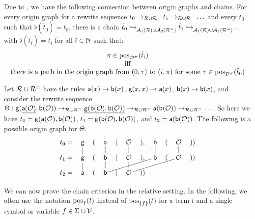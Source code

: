 Due to , we have the following connection between origin graphs and
chains. For every origin graph for a
rewrite sequence $t_0 \to_{\mathcal{R} \cup \mathcal{R}^{=}} t_1 \to_{\mathcal{R} \cup \mathcal{R}^{=}} \ldots$ and every
$\tilde{t}_0$ such that $\flat(\tilde{t}_0) = t_0$, there is a chain
 $\tilde{t}_0 \mathrel{ \xhookrightarrow{{}_{\scriptstyle }} \!\!{}^{}_{\mathcal{A}_{1}(\mathcal{R}) \cup \mathcal{A}_{2}(\mathcal{R}^{=})} } \tilde{t}_{1}
\mathrel{ \xhookrightarrow{{}_{\scriptstyle }} \!\!{}^{}_{\mathcal{A}_{1}(\mathcal{R}) \cup \mathcal{A}_{2}(\mathcal{R}^{=})} } \ldots$ with
$\flat(\tilde{t}_i) = t_i$ for all $i \in \mathbb{N}$ such that:
\[ \begin{array}{c}
\text{$\pi \in 
\mathrm{pos}_{\mathcal{D}^\#}(\tilde{t}_i)$}\\
\text{iff}\\
\text{there is a path in the origin graph
from $(0,\tau)$ to $(i,\pi)$ for some $\tau
\in \mathrm{pos}_{\mathcal{D}^\#}(\tilde{t}_0)$}
  \end{array}\]

\begin{example}\label{graph1}
    Let $\mathcal{R} \cup \mathcal{R}^{=}$ have 
    the rules $\mathsf{a}(x) \to \mathsf{b}(x)$, $\mathsf{g}(x,x) \to \mathsf{a}(x)$,   $\mathsf{b}(x) \to \mathsf{b}(x)$, and
    consider
    the rewrite sequence
    $\Theta:\mathsf{g}(\underline{\mathsf{a}(\mathcal{O})}, \mathsf{b}(\mathcal{O})) \to_{\mathcal{R}\cup \mathcal{R}^{=}} \underline{\mathsf{g}(\mathsf{b}(\mathcal{O}), \mathsf{b}(\mathcal{O}))} \to_{\mathcal{R}\cup \mathcal{R}^{=}} \mathsf{a}(\mathsf{b}(\mathcal{O})) \to_{\mathcal{R}\cup \mathcal{R}^{=}} \ldots$. So here we
    have $t_0 = \mathsf{g}(\mathsf{a}(\mathcal{O}), \mathsf{b}(\mathcal{O}))$, $t_1 = \mathsf{g}(\mathsf{b}(\mathcal{O}), \mathsf{b}(\mathcal{O}))$, and $t_2 =
    \mathsf{a}(\mathsf{b}(\mathcal{O}))$.
    The following is a possible origin graph for $\Theta$.
    \[ \xymatrix @-1.5pc {
        t_0=&\tg \ar@{-}[d] &(& \ta \ar@{-}[d]&(&\O\ar@{-}[d]&), & \tb\ar@{-}[d] & (&\O\ar@{-}[d]&)) \\
        t_1=&\tg \ar@{-}[d] &(    & \tb \ar@{-}[d]&(&\O\ar@{-}[d]&), & \tb\ar@{-}[dllll] & (&\O\ar@{-}[dllll]&)) \\
        t_2=&\ta            &( & \tb           &(&\O          &)) &                   &  &  &
    }
    \]
\end{example}

We can now prove the chain criterion in the relative setting.
In the following,
we often use the notation $\mathrm{pos}_{f}(t)$ instead of $\mathrm{pos}_{\{f\}}(t)$
for a term $t$ and a single symbol or variable $f \in \Sigma \cup \mathcal{V}$.

\RelChainCriterion*

